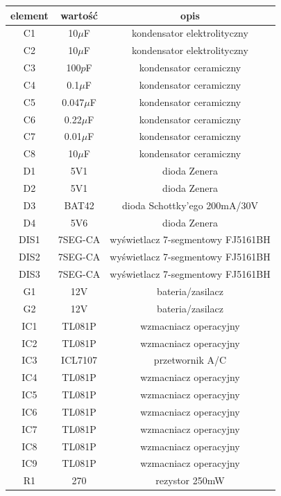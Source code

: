 \documentclass[12pt]{article}
\begin{document}
\begin{minipage}[t]{0.45\linewidth}
\tiny
\centering
\begin{tabular}{|c|c|c|}
\hline
element & wartość & opis \\
\hline
C1 & 10$\mu$F & kondensator elektrolityczny \\
\hline
C2 & 10$\mu$F & kondensator elektrolityczny \\
\hline
C3 & 100$p$F & kondensator ceramiczny \\
\hline
C4 & 0.1$\mu$F & kondensator ceramiczny \\
\hline
C5 & 0.047$\mu$F & kondensator ceramiczny \\
\hline
C6 & 0.22$\mu$F & kondensator ceramiczny \\
\hline
C7 & 0.01$\mu$F & kondensator ceramiczny \\
\hline
C8 & 10$\mu$F & kondensator ceramiczny \\
\hline
D1 & 5V1 & dioda Zenera \\
\hline
D2 & 5V1 & dioda Zenera \\
\hline
D3 & BAT42 & dioda Schottky'ego 200mA/30V \\
\hline
D4 & 5V6 & dioda Zenera \\
\hline
DIS1 & 7SEG-CA & wyświetlacz 7-segmentowy FJ5161BH \\
\hline
DIS2 & 7SEG-CA & wyświetlacz 7-segmentowy FJ5161BH \\
\hline
DIS3 & 7SEG-CA & wyświetlacz 7-segmentowy FJ5161BH \\
\hline 
G1 & 12V & bateria/zasilacz \\
\hline
G2 & 12V & bateria/zasilacz \\
\hline 
IC1 & TL081P & wzmacniacz operacyjny \\
\hline 
IC2 & TL081P & wzmacniacz operacyjny \\
\hline 
IC3 & ICL7107 & przetwornik A/C \\
\hline 
IC4 & TL081P & wzmacniacz operacyjny \\
\hline
IC5 & TL081P & wzmacniacz operacyjny \\
\hline 
IC6 & TL081P & wzmacniacz operacyjny \\
\hline 
IC7 & TL081P & wzmacniacz operacyjny \\
\hline 
IC8 & TL081P & wzmacniacz operacyjny \\
\hline 
IC9 & TL081P & wzmacniacz operacyjny \\
\hline
R1 & 270 & rezystor 250mW \\
\hline

\end{tabular}
\end{minipage}
\end{document}
